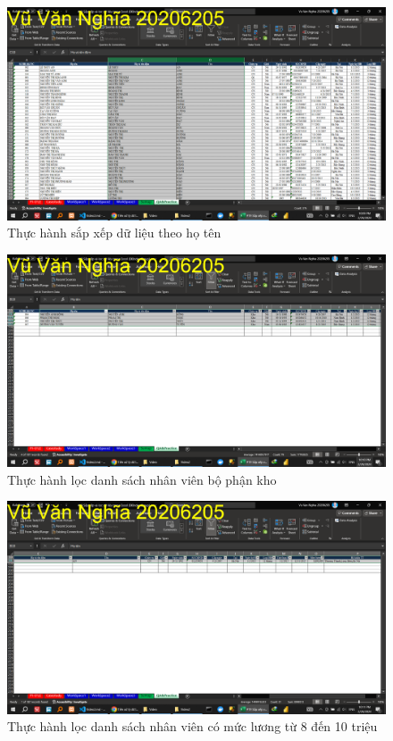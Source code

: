 \documentclass{article}
\begin{document}
\begin{figure}[H]
\centering
\includegraphics[scale = 0.15]{Video2/ThucHanh/2.png}
\caption{Thực hành sắp xếp dữ liệu theo họ tên}
\end{figure}

\begin{figure}[H]
\centering
\includegraphics[scale = 0.15]{Video2/ThucHanh/3.png}
\caption{Thực hành lọc danh sách nhân viên bộ phận kho}
\end{figure}

\begin{figure}[H]
\centering
\includegraphics[scale = 0.15]{Video2/ThucHanh/4.png}
\caption{Thực hành lọc danh sách nhân viên có mức lương từ 8 đến 10 triệu}
\end{figure}
\end{document}
